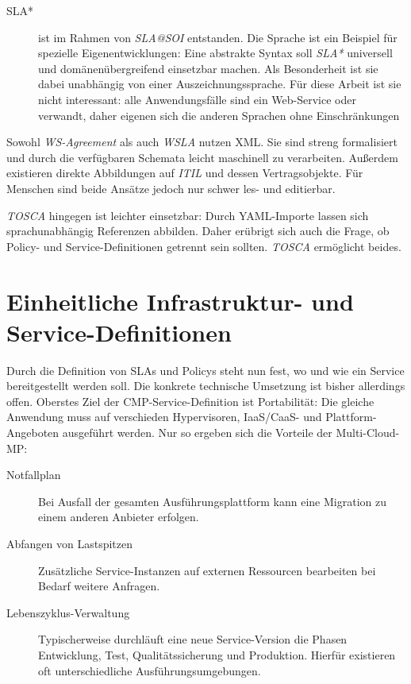 \begin{description}

	\item[SLA*] ist im Rahmen von \emph{SLA@SOI} entstanden. Die Sprache ist ein Beispiel für spezielle Eigenentwicklungen: Eine abstrakte Syntax soll \emph{SLA*} universell und domänenübergreifend einsetzbar machen. Als Besonderheit ist sie dabei unabhängig von einer Auszeichnungssprache. Für diese Arbeit ist sie nicht interessant: alle Anwendungsfälle sind ein Web-Service oder verwandt, daher eigenen sich die anderen Sprachen ohne Einschränkungen

\end{description}

\noindent
Sowohl \emph{WS-Agreement} als auch \emph{WSLA} nutzen XML. Sie sind streng formalisiert und durch die verfügbaren Schemata leicht maschinell zu verarbeiten. Außerdem existieren direkte Abbildungen auf \emph{ITIL} und dessen Vertragsobjekte. Für Menschen sind beide Ansätze jedoch nur schwer les- und editierbar.


\emph{TOSCA} hingegen ist leichter einsetzbar: Durch YAML-Importe lassen sich sprachunabhängig Referenzen abbilden. Daher erübrigt sich auch die Frage, ob Policy- und Service-Definitionen getrennt sein sollten. \emph{TOSCA} ermöglicht beides. 


\section{Einheitliche Infrastruktur- und Service-Definitionen}%

Durch die Definition von SLAs und Policys steht nun fest, wo und wie ein Service bereitgestellt werden soll. Die konkrete technische Umsetzung ist bisher allerdings offen. Oberstes Ziel der CMP-Service-Definition ist Portabilität: Die gleiche Anwendung muss auf verschieden Hypervisoren, IaaS/CaaS- und Plattform-Angeboten ausgeführt werden. Nur so ergeben sich die Vorteile der Multi-Cloud-MP:

\begin{description}
	
	\item[Notfallplan] Bei Ausfall der gesamten Ausführungsplattform kann eine Migration zu einem anderen Anbieter erfolgen.
	
	\item[Abfangen von Lastspitzen] Zusätzliche Service-Instanzen auf externen Ressourcen bearbeiten bei Bedarf weitere Anfragen.
	
	\item[Lebenszyklus-Verwaltung] Typischerweise durchläuft eine neue Service-Version die Phasen Entwicklung, Test, Qualitätssicherung und Produktion. Hierfür existieren oft unterschiedliche Ausführungsumgebungen.
	
\end{description}

